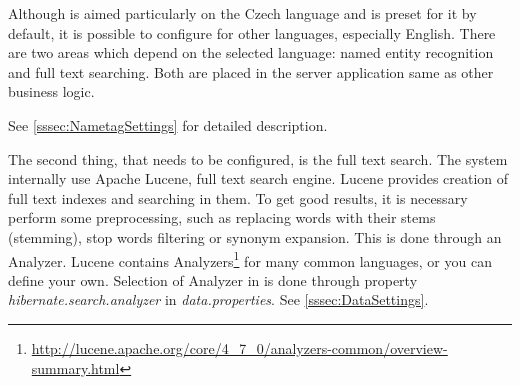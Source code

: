 
Although \textan{} is aimed particularly on the Czech language and is preset for
it by default, it is possible to configure \textan{} for other languages, especially
English. There are two areas which depend on the selected language: named entity
recognition and full text searching. Both are placed in the server application
same as other business logic.

See \ref{sssec:NametagSettings} for detailed description.

The second thing, that needs to be configured, is the full text search. The system
internally use Apache Lucene, full text search engine. Lucene provides creation
of full text indexes and searching in them. To get good results, it is necessary
perform some preprocessing, such as replacing words with their stems (stemming),
stop words filtering or synonym expansion. This is done through an Analyzer. Lucene
contains Analyzers\footnote{\url{http://lucene.apache.org/core/4_7_0/analyzers-common/overview-summary.html}}
for many common languages, or you can define your own. Selection of Analyzer in 
\textan{} is done through property \emph{hibernate.search.analyzer} in \emph{data.properties}.
See \ref{sssec:DataSettings}.

